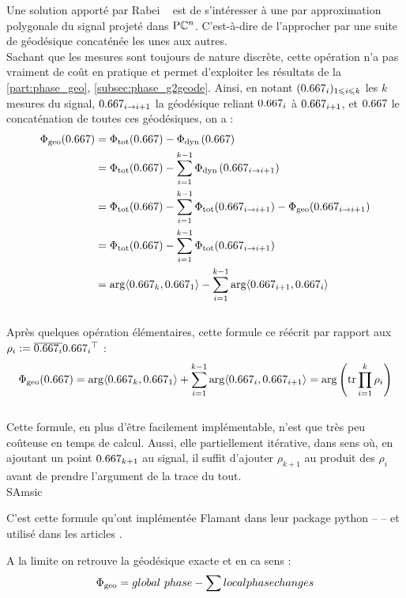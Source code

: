 Une solution apporté par Rabei \etal~\cite{rabei_bargmann_1999} est de s'intéresser à une par approximation polygonale du signal projeté dans $\text{\normalfont P}\mathbb{C}^{n}$. 
C'est-à-dire de l'approcher par une suite de géodésique concaténée les unes aux autres. 
\\
Sachant que les mesures sont toujours de nature discrète, cette opération n'a pas vraiment de coût en pratique et permet d'exploiter les résultats de la \cref{part:phase_geo}, \cref{subsec:phase_g2geode}. 
Ainsi, en notant $(\x_i)_{1\leq i\leq k}$ les $k$ mesures du signal, $\x_{i\rightarrow i+1}$ la géodésique reliant $\x_i$ à $\x_{i+1}$, et $\x$ le concaténation de toutes ces géodésiques, on a  :
\begin{align*}
\phaseg(\x) &= \phaset(\x) - \phased(\x) \\
	&= \phaset(\x) - \sum_{i=1}^{k-1} \phased(\x_{i\rightarrow i+1}) \\
	&= \phaset(\x) - \sum_{i=1}^{k-1} \phaset(\x_{i\rightarrow i+1}) - \phaseg(\x_{i\rightarrow i+1}) \\
	&= \phaset(\x) - \sum_{i=1}^{k-1} \phaset(\x_{i\rightarrow i+1}) \\
	&= \arg\langle\x_k, \x_1\rangle - \sum_{i=1}^{k-1} \arg\langle\x_{i+1}, \x_i\rangle
\end{align*} 
\\
Après quelques opération élémentaires, cette formule ce réécrit par rapport aux $\rho_i \defeq \congu{\x_i}\transp{\x_i}$ :
\begin{equation} \label{eq:bargmann}
	\phaseg(\x) = \arg\langle\x_k, \x_1\rangle + \sum_{i=1}^{k-1} \arg\langle\x_i, \x_{i+1}\rangle = \arg \left( \tr \prod_{i=1}^{k} \rho_i \right)
\end{equation}
\\
Cette formule, en plus d'être facilement implémentable, n'est que très peu coûteuse en temps de calcul. Aussi, elle partiellement itérative, dans sens où, en ajoutant un point $\x_{k+1}$ au signal, il suffit d'ajouter $\rho_{k+1}$ au produit des $\rho_i$ avant de prendre l'argument de la trace du tout.
\\SAmsic

C'est cette formule qu'ont implémentée Flamant \etal dans leur package python  --  -- et utilisé dans les articles \cite{le_bihan_modephysiques_2023, le_bihan_geometric_2024}.
\\
\begin{remarque}
	A la limite on retrouve la géodésique exacte et en ca sens :\cite{sjoqvist_geometric_2015}
	\[\Phi_{\text{\normalfont geo}} = global\ phase - \sum local phase changes\]
\end{remarque}




